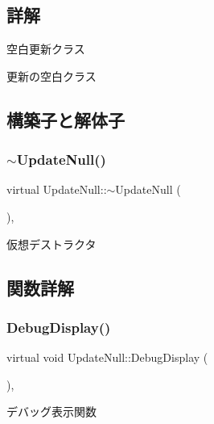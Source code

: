 \subsection{詳解}
空白更新クラス 

更新の空白クラス 

\subsection{構築子と解体子}
\mbox{\label{class_update_null_a121a3045119935eb2704ef282bba2f9f}} 
\subsubsection{\texorpdfstring{$\sim$\+Update\+Null()}{~UpdateNull()}}
{\footnotesize\ttfamily virtual Update\+Null\+::$\sim$\+Update\+Null (\begin{DoxyParamCaption}{ }\end{DoxyParamCaption})\hspace{0.3cm}{\ttfamily [inline]}, {\ttfamily [virtual]}}



仮想デストラクタ 



\subsection{関数詳解}
\mbox{\label{class_update_null_a77aee1e614cf6dafe4f9af58b2205e4b}} 
\subsubsection{\texorpdfstring{Debug\+Display()}{DebugDisplay()}}
{\footnotesize\ttfamily virtual void Update\+Null\+::\+Debug\+Display (\begin{DoxyParamCaption}{ }\end{DoxyParamCaption})\hspace{0.3cm}{\ttfamily [inline]}, {\ttfamily [virtual]}}



デバッグ表示関数 



